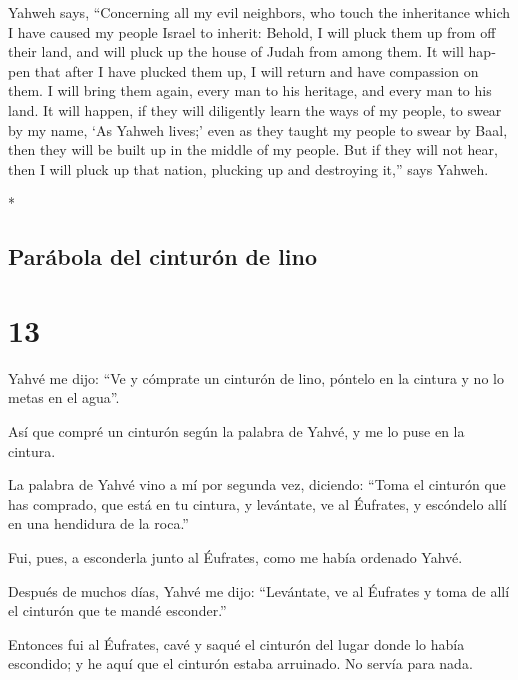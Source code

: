 \begin{paracol}{2}
\begin{otherlanguage}{english}
 Yahweh says, ``Concerning all my evil neighbors, who
touch the inheritance which I have caused my people Israel to inherit:
Behold, I will pluck them up from off their land, and will pluck up the
house of Judah from among them.  It will happen that
after I have plucked them up, I will return and have compassion on them.
I will bring them again, every man to his heritage, and every man to his
land.  It will happen, if they will diligently learn the
ways of my people, to swear by my name, `As Yahweh lives;' even as they
taught my people to swear by Baal, then they will be built up in the
middle of my people.  But if they will not hear, then I
will pluck up that nation, plucking up and destroying it,'' says Yahweh.

\end{otherlanguage}

\switchcolumn[0]*

\hypertarget{paruxe1bola-del-cinturuxf3n-de-lino}{%
\subsection{Parábola del cinturón de
lino}\label{paruxe1bola-del-cinturuxf3n-de-lino}}

\hypertarget{section-24}{%
\section{13}\label{section-24}}

 Yahvé me dijo: ``Ve y cómprate un cinturón de lino,
póntelo en la cintura y no lo metas en el agua''.

 Así que compré un cinturón según la palabra de Yahvé, y
me lo puse en la cintura.

 La palabra de Yahvé vino a mí por segunda vez, diciendo:
 ``Toma el cinturón que has comprado, que está en tu
cintura, y levántate, ve al Éufrates, y escóndelo allí en una hendidura
de la roca.''

 Fui, pues, a esconderla junto al Éufrates, como me había
ordenado Yahvé.

 Después de muchos días, Yahvé me dijo: ``Levántate, ve al
Éufrates y toma de allí el cinturón que te mandé esconder.''

 Entonces fui al Éufrates, cavé y saqué el cinturón del
lugar donde lo había escondido; y he aquí que el cinturón estaba
arruinado. No servía para nada.


\end{paracol}
